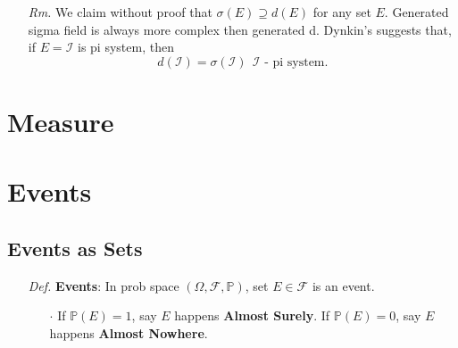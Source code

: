\documentclass[a4paper,12pt,twoside]{book}
\begin{document}
\begin{itemize}
	\item[\textit{Rm.}] We claim without proof that $\sigma(E)\supseteq d(E)$ for any set $E$. Generated sigma field is always more complex then generated d. Dynkin's suggests that, if $E=\mathcal{I}$ is pi system, then
	\begin{equation}
		d(\mathcal{I})=\sigma(\mathcal{I})~~\mathcal{I}\text{ - pi system.}
	\end{equation}
\end{itemize}


\section{Measure}

\section{Events}

\subsection{Events as Sets}
\begin{itemize}
	\item[\textit{Def.}] \textbf{Events}: In prob space $(\Omega, \mathcal{F}, \mathbb{P})$, set $E\in \mathcal{F}$ is an event.
	\begin{itemize}
		\item[$\cdot$] If $\mathbb{P}(E)=1$, say $E$ happens \textbf{Almost Surely}. If $\mathbb{P}(E)=0$, say $E$ happens \textbf{Almost Nowhere}.
	\end{itemize}
\end{itemize}

\end{document}

